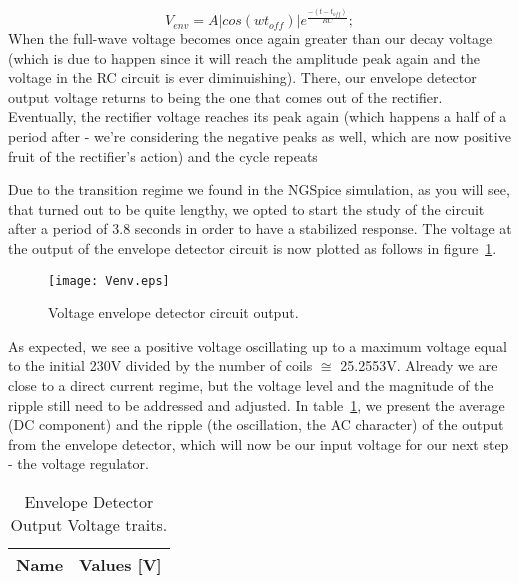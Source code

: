 \begin{equation}
V_{env} = A|cos(wt_{off})|e^\frac{-(t-t_{off})}{RC};
\end{equation}
When the full-wave voltage becomes once again greater than our decay voltage (which is due to happen since it will reach the amplitude peak again and the voltage in the RC circuit is ever diminuishing). There, our envelope detector output voltage returns to being the one that comes out of the rectifier. Eventually, the rectifier voltage reaches its peak again (which happens a half of a period after - we're considering the negative peaks as well, which are now positive fruit of the rectifier's action) and the cycle repeats

Due to the transition regime we found in the NGSpice simulation, as you will see, that turned out to be quite lengthy, we opted to start the study of the circuit after a period of 3.8 seconds in order to have a stabilized response.
The voltage at the output of the envelope detector circuit is now plotted as follows in figure~\ref{fig:enveloped}.
\begin{figure}[h!] \centering
\texttt{[image: Venv.eps]}
\caption{Voltage envelope detector circuit output.}
\label{fig:enveloped}
\end{figure} \par
As expected, we see a positive voltage oscillating up to a maximum voltage equal to the initial 230V divided by the number of coils $\cong$ 25.2553V. Already we are close to a direct current regime, but the voltage level and the magnitude of the ripple still need to be addressed and adjusted. In table~\ref{tab:envio}, we present the average (DC component) and the ripple (the oscillation, the AC character) of the output from the envelope detector, which will now be our input voltage for our next step - the voltage regulator.

\begin{table}[h]
  \centering
  \begin{tabular}{|l|r|}
    \hline    
    {\bf Name} & {\bf Values [V]} \\ \hline
     
  \end{tabular}
  \caption{Envelope Detector Output Voltage traits.}
  \label{tab:envio}
\end{table}

